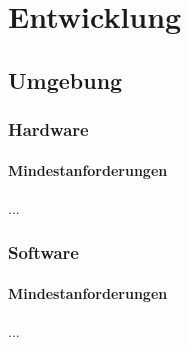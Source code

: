 %
%


\chapter{Entwicklung}
\label{Entwicklung}


\section{Umgebung}

\subsection{Hardware}

\subsubsection{Mindestanforderungen}

...
\\


\subsection{Software}

\subsubsection{Mindestanforderungen}

...
\\



